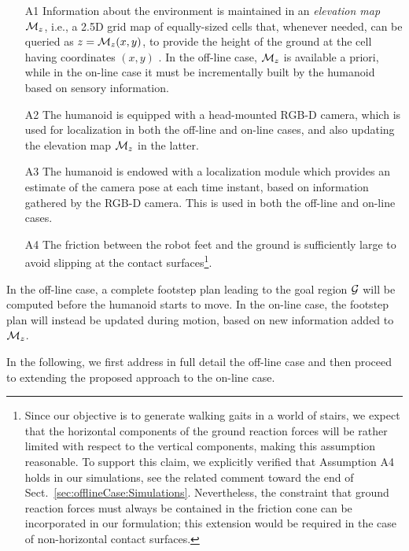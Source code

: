 \begin{itemize}

\item[A1] Information about the environment is maintained in an {\em elevation map} ${\cal M}_{z}$, i.e., a 2.5D grid map of equally-sized cells that, whenever needed, can be queried as $z = {\cal M}_{z}(x,y)$, to provide the height of the ground at the cell having coordinates $(x,y)$ \cite{BuHeBe:16}.
In the off-line case, ${\cal M}_{z}$ is available a priori, while in the on-line case it must be incrementally built by the humanoid based on sensory information. 
    
\item[A2] The humanoid is equipped with a head-mounted RGB-D camera, which is used for localization in both the off-line and on-line cases, and also updating the elevation map ${\cal M}_{z}$ in the latter.
    
\item[A3] The humanoid is endowed with a localization module which provides an estimate of the camera pose at each time instant, based on information gathered by the RGB-D camera. This is used in both the off-line and on-line cases.

\item[A4] The friction between the robot feet and the ground is sufficiently large to avoid slipping at the contact surfaces\footnote{Since our objective is to generate walking gaits in a world of stairs, we expect that the horizontal components of the ground reaction forces will be rather limited with respect to the vertical components, making this assumption reasonable. To support this claim, we explicitly verified that Assumption A4 holds in our simulations, see the related comment toward the end of Sect.~\ref{sec:offlineCase:Simulations}. Nevertheless, the constraint that ground reaction forces must always be contained in the friction cone can be incorporated in our formulation; this extension would be required in the case of non-horizontal contact surfaces.}.

\end{itemize}

In the off-line case, a complete footstep plan leading to the goal region $\cal G$ will be computed before the humanoid starts to move. In the on-line case, the footstep plan will instead be updated during motion, based on new information added to ${\cal M}_{z}$. 

In the following, we first address in full detail the off-line case and then proceed to extending the proposed approach to the on-line case.

